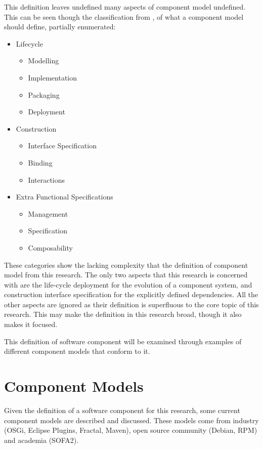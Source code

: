This definition leaves undefined many aspects of component model undefined. 
This can be seen though the classification from \cite{Crnkovic2011}, of what a component model should define, partially enumerated:
\begin{itemize}
  \item Lifecycle 
  		\begin{itemize}
	  		\item Modelling
	  		\item Implementation
	  		\item Packaging
	  		\item Deployment
		\end{itemize}
	\item Construction
		\begin{itemize}
	  		\item Interface Specification
	  		\item Binding
	  		\item Interactions 
		\end{itemize}
	\item Extra Functional Specifications
		\begin{itemize}
	  		\item Management
	  		\item Specification
	  		\item Composability
		\end{itemize}	
\end{itemize}  
These categories show the lacking complexity that the definition of component model from this research.
The only two aspects that this research is concerned with are the life-cycle deployment for the evolution of a component system, 
and construction interface specification for the explicitly defined dependencies.
All the other aspects are ignored as their definition is superfluous to the core topic of this research.
This may make the definition in this research broad, though it also makes it focused.

This definition of software component will be examined through examples of different component models that conform to it.

\section{Component Models}
\label{background.models}
Given the definition of a software component for this research, some current component models are described and discussed.
These models come from industry (OSGi, Eclipse Plugins, Fractal, Maven), open source community (Debian, RPM) and academia (SOFA2).

